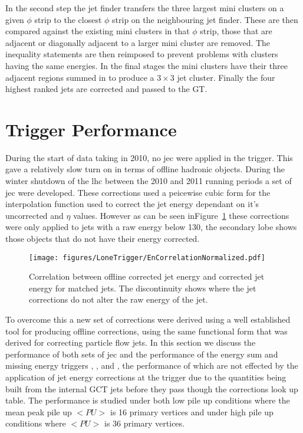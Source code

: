 In the second step the jet finder transfers the three largest mini clusters on 
a given $\phi$ strip to the closest $\phi$ strip on the neighbouring jet finder.
These are then compared against the existing mini clusters in that $\phi$ strip,
those that are adjacent or diagonally adjacent to a larger mini cluster are 
removed. The inequality statements are then reimposed to prevent problems
with clusters having the same energies. In the final stages the mini clusters
have their three adjacent regions summed in to produce a $3 \times 3$ jet
cluster. Finally the four highest ranked jets are corrected and passed to the 
GT.

\section{\Lone Trigger Performance} %

During the start of data taking in 2010, no \ac{jec} were 
applied in the \Lone trigger. This gave a relatively slow turn on in terms of 
offline hadronic objects.
During the winter shutdown of the \ac{lhc} between the 2010 and 2011 running 
periods a set of \Lone \ac{jec} were developed. These corrections used a peicewise cubic form for the interpolation function used to correct the jet energy dependant on it's uncorrected \ET and $\eta$ values. However as can be seen inFigure~\ref{fig:figures_LoneTrigger_EnCorrelationNormalized} these corrections were only applied to jets with a raw energy below \unit{130}{\GeV}, the secondary lobe shows those objects that do not have their energy corrected.

\begin{figure}[htbp]
  \centering
    \texttt{[image: figures/LoneTrigger/EnCorrelationNormalized.pdf]}
  \caption{Correlation between offline corrected jet energy and \Lone corrected jet energy for matched jets. The discontinuity shows where the \Lone jet corrections do not alter the raw energy of the jet.}
  \label{fig:figures_LoneTrigger_EnCorrelationNormalized}
\end{figure}

To overcome this a new set of corrections were derived using a well established 
tool for producing offline corrections,  
using the same functional form that was derived for correcting particle flow 
jets. 
In this section we discuss the performance of both sets of \Lone \ac{jec} and 
the performance of the energy sum and missing energy triggers \HT, \HTm, and 
\MET, the performance of which are not effected by the application of jet 
energy corrections at the \Lone trigger due to the quantities being built from 
the internal GCT jets before they pass though the corrections look up table.
The performance is studied under both low pile up conditions where the mean 
peak pile up $<PU>$ is 16 primary vertices and under high pile up conditions 
where $<PU>$ is 36 primary vertices.

